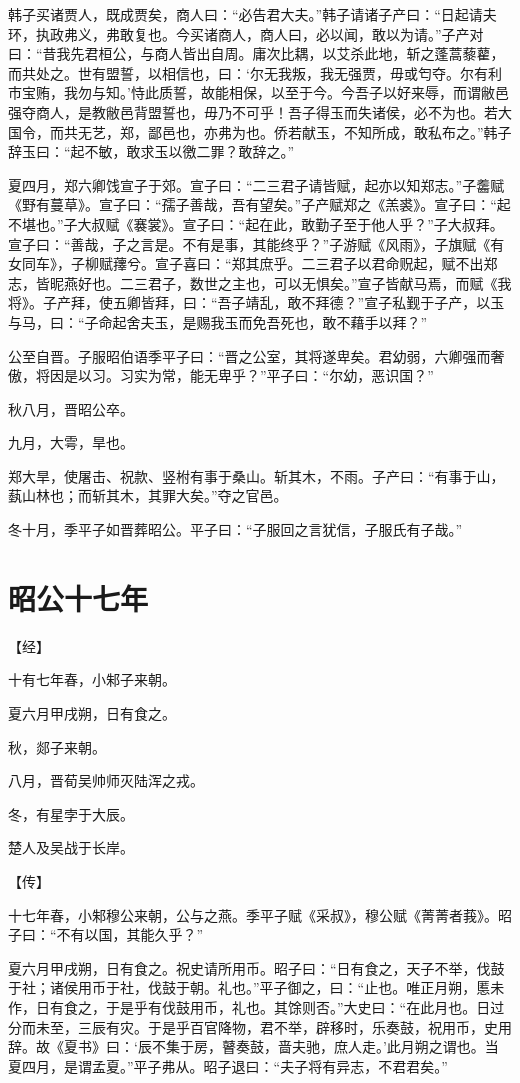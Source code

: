 \documentclass[a4paper,12pt,UTF8,twoside]{ctexbook}
\begin{document}
韩子买诸贾人，既成贾矣，商人曰：“必告君大夫。”韩子请诸子产曰：“日起请夫环，执政弗义，弗敢复也。今买诸商人，商人曰，必以闻，敢以为请。”子产对曰：“昔我先君桓公，与商人皆出自周。庸次比耦，以艾杀此地，斩之蓬蒿藜藋，而共处之。世有盟誓，以相信也，曰：‘尔无我叛，我无强贾，毋或匄夺。尔有利市宝贿，我勿与知。’恃此质誓，故能相保，以至于今。今吾子以好来辱，而谓敝邑强夺商人，是教敝邑背盟誓也，毋乃不可乎！吾子得玉而失诸侯，必不为也。若大国令，而共无艺，郑，鄙邑也，亦弗为也。侨若献玉，不知所成，敢私布之。”韩子辞玉曰：“起不敏，敢求玉以徼二罪？敢辞之。”

夏四月，郑六卿饯宣子于郊。宣子曰：“二三君子请皆赋，起亦以知郑志。”子齹赋《野有蔓草》。宣子曰：“孺子善哉，吾有望矣。”子产赋郑之《羔裘》。宣子曰：“起不堪也。”子大叔赋《褰裳》。宣子曰：“起在此，敢勤子至于他人乎？”子大叔拜。宣子曰：“善哉，子之言是。不有是事，其能终乎？”子游赋《风雨》，子旗赋《有女同车》，子柳赋蘀兮。宣子喜曰：“郑其庶乎。二三君子以君命贶起，赋不出郑志，皆昵燕好也。二三君子，数世之主也，可以无惧矣。”宣子皆献马焉，而赋《我将》。子产拜，使五卿皆拜，曰：“吾子靖乱，敢不拜德？”宣子私觐于子产，以玉与马，曰：“子命起舍夫玉，是赐我玉而免吾死也，敢不藉手以拜？”

公至自晋。子服昭伯语季平子曰：“晋之公室，其将遂卑矣。君幼弱，六卿强而奢傲，将因是以习。习实为常，能无卑乎？”平子曰：“尔幼，恶识国？”

秋八月，晋昭公卒。

九月，大雩，旱也。

郑大旱，使屠击、祝款、竖柎有事于桑山。斩其木，不雨。子产曰：“有事于山，蓺山林也；而斩其木，其罪大矣。”夺之官邑。

冬十月，季平子如晋葬昭公。平子曰：“子服回之言犹信，子服氏有子哉。”


\section{昭公十七年}


【经】

十有七年春，小邾子来朝。

夏六月甲戌朔，日有食之。

秋，郯子来朝。

八月，晋荀吴帅师灭陆浑之戎。

冬，有星孛于大辰。

楚人及吴战于长岸。

【传】

十七年春，小邾穆公来朝，公与之燕。季平子赋《采叔》，穆公赋《菁菁者莪》。昭子曰：“不有以国，其能久乎？”

夏六月甲戌朔，日有食之。祝史请所用币。昭子曰：“日有食之，天子不举，伐鼓于社；诸侯用币于社，伐鼓于朝。礼也。”平子御之，曰：“止也。唯正月朔，慝未作，日有食之，于是乎有伐鼓用币，礼也。其馀则否。”大史曰：“在此月也。日过分而未至，三辰有灾。于是乎百官降物，君不举，辟移时，乐奏鼓，祝用币，史用辞。故《夏书》曰：‘辰不集于房，瞽奏鼓，啬夫驰，庶人走。’此月朔之谓也。当夏四月，是谓孟夏。”平子弗从。昭子退曰：“夫子将有异志，不君君矣。”
\end{document}
